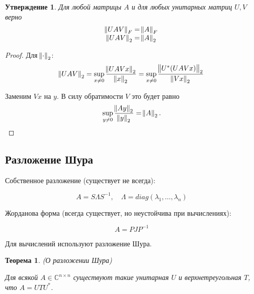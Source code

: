 \documentclass[a4paper, 12pt]{article}
\newcommand{\CC}{\mathbb{C}}
\newtheorem{theorem}{Теорема}[section]
\newtheorem{assertion}{Утверждение}[section]
\begin{document}
\begin{assertion}
    Для любой матрицы $A$ и для любых унитарных матриц $U, V$ верно
    \[
        \begin{array}{c}
            \norm{U A V}_F = \norm{A}_F \\
            \norm{U A V}_2 = \norm{A}_2
        \end{array}
    \]
\end{assertion}

\begin{proof}
    Для $\norm{\cdot}_2$:
    \[
        \norm{U A V}_2 = \sup_{x \ne 0} \frac{\norm{U A V x}_2}{\norm{x}_2}
        = \sup_{x \ne 0} \frac{\norm{U^*(U A V x)}_2}{\norm{V x}_2}
    \]

    Заменим $V x$ на $y$. В силу обратимости $V$ это будет равно
    \[
        \sup_{y \ne 0} \frac{\norm{A y}_2}{\norm{y}_2} = \norm{A}_2.
    \]
\end{proof}

\subsection{Разложение Шура}

Собственное разложение (существует не всегда):

\[
    A = S \Lambda S^{-1}, \quad \Lambda = diag(\lambda_1, \dots, \lambda_n)
\]

Жорданова форма (всегда существует, но неустойчива при вычислениях):

\[
    A = P J P^{-1}
\]

Для вычислений используют разложение Шура.

\begin{theorem}
    (О разложении Шура)

    Для всякой $A \in \CC^{n \times n}$ существуют такие унитарная $U$ и
    верхнетреугольная $T$, что $A = U T U^*$.
\end{theorem}
\end{document}
